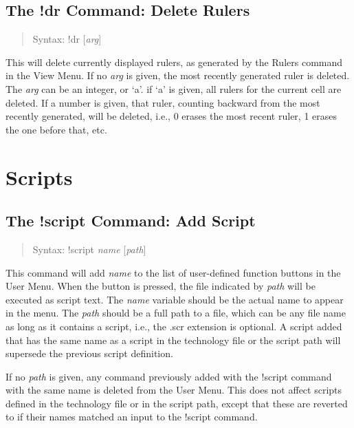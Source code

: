\subsection{The {\cb !dr} Command: Delete Rulers}
\begin{quote}
Syntax: {\vt !dr} [{\it arg\/}]
\end{quote}
This will delete currently displayed rulers, as generated by the {\cb
Rulers} command in the {\cb View Menu}.  If no {\it arg} is given, the
most recently generated ruler is deleted.  The {\it arg} can be an
integer, or `{\vt a}'.  if `{\vt a}' is given, all rulers for the
current cell are deleted.  If a number is given, that ruler, counting
backward from the most recently generated, will be deleted, i.e., 0
erases the most recent ruler, 1 erases the one before that, etc.


\section{Scripts}

\subsection{The {\cb !script} Command: Add Script}
\begin{quote}
Syntax: {\vt !script} {\it name} [{\it path\/}]
\end{quote}
This command will add {\it name} to the list of user-defined function
buttons in the {\cb User Menu}.  When the button is pressed, the file
indicated by {\it path} will be executed as script text.  The {\it
name} variable should be the actual name to appear in the menu.  The
{\it path} should be a full path to a file, which can be any file name
as long as it contains a script, i.e., the {\vt .scr} extension is
optional.  A script added that has the same name as a script in the
technology file or the script path will supersede the previous script
definition.

If no {\it path} is given, any command previously added with the {\cb
!script} command with the same name is deleted from the {\cb User
Menu}.  This does not affect scripts defined in the technology file or
in the script path, except that these are reverted to if their names
matched an input to the {\cb !script} command.

